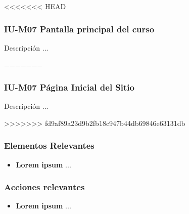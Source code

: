 
<<<<<<< HEAD
\subsubsection{IU-M07 Pantalla principal del curso}

 Descripción ...

=======
\subsubsection{IU-M07 Página Inicial del Sitio}

 Descripción ...

>>>>>>> fd9af89a23d9b2fb18c947b44db69846e63131db

\subsubsection{Elementos Relevantes}

    \begin{itemize}
    \item {\bf Lorem ipsum}
        ...
    \end{itemize}

\subsubsection{Acciones relevantes}

    \begin{itemize}
    \item {\bf Lorem ipsum}
        ...
    \end{itemize}

\clearpage
